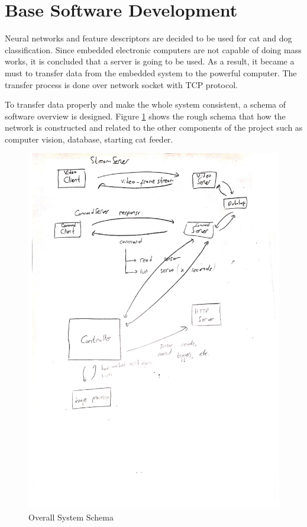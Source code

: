 \section{Base Software Development} \label{sec:software}

Neural networks and feature descriptors are decided to be used for cat and dog classification. Since embedded electronic computers are not capable of doing mass works, it is concluded that a server is going to be used. As a result, it became a must to transfer data from the embedded system to the powerful computer. The transfer process is done over network socket with TCP protocol.

To transfer data properly and make the whole system consistent, a schema of software overview is designed. Figure \ref{fig:overallView} shows the rough schema that how the network is constructed and related to the other components of the project such as computer vision, database, starting cat feeder.

\begin{figure}[htp]
    \centering
    \includegraphics[width=0.98\linewidth]{SchemaSharpened.jpg}
    \caption{Overall System Schema}
    \label{fig:overallView}
\end{figure}


